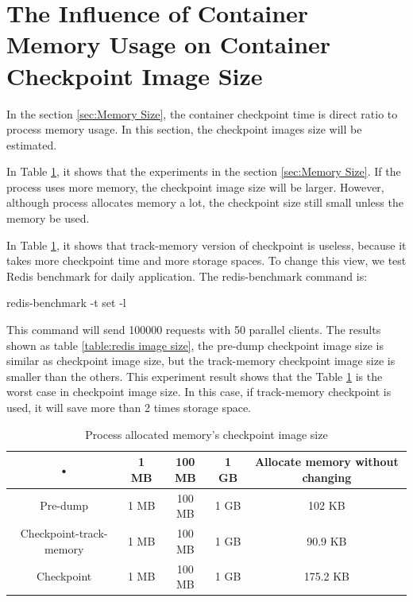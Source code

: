\section{The Influence of Container Memory Usage on Container Checkpoint Image Size}
In the section \ref{sec:Memory Size}, the container checkpoint time is direct ratio to process memory usage. In this section, the checkpoint images size will be estimated.

In Table \ref{table:process image size}, it shows that the experiments in the section \ref{sec:Memory Size}. If the process uses more memory, the checkpoint image size will be larger. However, although process allocates memory a lot, the checkpoint size still small unless the memory be used.

In Table \ref{table:process image size}, it shows that track-memory version of checkpoint is useless, because it takes more checkpoint time and more storage spaces. To change this view, we test Redis benchmark for daily application. The redis-benchmark command is:
\begin{center}
redis-benchmark -t set -l
\end{center}
This command will send 100000 requests with 50 parallel clients. The results shown as table \ref{table:redis image size}, the pre-dump checkpoint image size is similar as checkpoint image size, but the track-memory checkpoint image size is smaller than the others. This experiment result shows that the Table \ref{table:process image size} is the worst case in checkpoint image size. In this case, if track-memory checkpoint is used, it will save more than 2 times storage space.

\begin{table}[hbtp]
\begin{center}
\begin{tabular}{|c|c|c|c|c|}\hline 
• & 1 MB & 100 MB & 1 GB & Allocate memory without changing\\ 
\hline 
Pre-dump & 1 MB & 100 MB & 1 GB & 102 KB\\ 
\hline 
Checkpoint-track-memory & 1 MB & 100 MB & 1 GB & 90.9 KB \\ 
\hline 
Checkpoint & 1 MB & 100 MB & 1 GB & 175.2 KB \\ 
\hline 
\end{tabular}
\caption{Process allocated memory's checkpoint image size}
\label{table:process image size}
\end{center}
\end{table}

